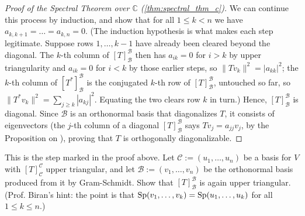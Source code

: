 \begin{proof}[Proof of the Spectral Theorem over $\mathbb{C}$ (\cref{thm:spectral_thm_c})]
We can continue this process by induction, and show that for all $1 \leq k < n$ we have $a_{k, k+1} = \dots = a_{k,n} = 0$. (The induction hypothesis is what makes each step legitimate. Suppose rows $1, \dots, k-1$ have already been cleared beyond the diagonal. The $k$-th column of $[T]_{\mathcal{B}}^{\mathcal{B}}$ then has $a_{ik} = 0$ for $i > k$ by upper triangularity and $a_{ik} = 0$ for $i < k$ by those earlier steps, so $\|Tv_k\|^2 = |a_{kk}|^2$; the $k$-th column of $[T^*]_{\mathcal{B}}^{\mathcal{B}}$ is the conjugated $k$-th row of $[T]_{\mathcal{B}}^{\mathcal{B}}$, untouched so far, so $\|T^*v_k\|^2 = \sum_{j \geq k} |a_{kj}|^2$. Equating the two clears row $k$ in turn.) Hence, $[T]_{\mathcal{B}}^{\mathcal{B}}$ is diagonal. Since $\mathcal{B}$ is an orthonormal basis that diagonalizes $T$, it consists of eigenvectors (the $j$-th column of a diagonal $[T]_{\mathcal{B}}^{\mathcal{B}}$ says $Tv_j = a_{jj} v_j$, by the Proposition on ), proving that $T$ is orthogonally diagonalizable.
\end{proof}

\begin{exercise}
\label{exc:gram_schmidt_keeps_triangular}
This is the step marked  in the proof above. Let $\mathcal{C} := (u_1, \dots, u_n)$ be a basis for $V$ with $[T]_{\mathcal{C}}^{\mathcal{C}}$ upper triangular, and let $\mathcal{B} := (v_1, \dots, v_n)$ be the orthonormal basis produced from it by Gram-Schmidt. Show that $[T]_{\mathcal{B}}^{\mathcal{B}}$ is again upper triangular. (Prof. Biran's hint: the point is that $\operatorname{Sp}(v_1, \dots, v_k) = \operatorname{Sp}(u_1, \dots, u_k)$ for all $1 \leq k \leq n$.)
\end{exercise}

